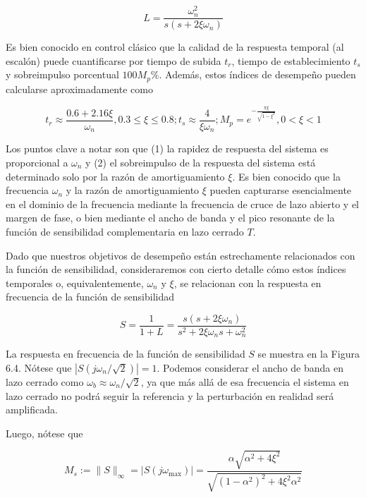 $$
L=\frac{\omega_{n}^{2}}{s\left(s+2 \xi \omega_{n}\right)}
$$

Es bien conocido en control clásico que la calidad de la respuesta temporal (al escalón) puede cuantificarse por tiempo de subida $t_{r}$, tiempo de establecimiento $t_{s}$ y sobreimpulso porcentual $100 M_{p} \%$. Además, estos índices de desempeño pueden calcularse aproximadamente como

$$
t_{r} \approx \frac{0.6+2.16 \xi}{\omega_{n}}, 0.3 \leq \xi \leq 0.8 ; t_{s} \approx \frac{4}{\xi \omega_{n}} ; M_{p}=e^{-\frac{\pi \xi}{\sqrt{1-\xi^{2}}}}, 0<\xi<1
$$

Los puntos clave a notar son que (1) la rapidez de respuesta del sistema es proporcional a $\omega_{n}$ y (2) el sobreimpulso de la respuesta del sistema está determinado solo por la razón de amortiguamiento $\xi$. Es bien conocido que la frecuencia $\omega_{n}$ y la razón de amortiguamiento $\xi$ pueden capturarse esencialmente en el dominio de la frecuencia mediante la frecuencia de cruce de lazo abierto y el margen de fase, o bien mediante el ancho de banda y el pico resonante de la función de sensibilidad complementaria en lazo cerrado $T$.

Dado que nuestros objetivos de desempeño están estrechamente relacionados con la función de sensibilidad, consideraremos con cierto detalle cómo estos índices temporales o, equivalentemente, $\omega_{n}$ y $\xi$, se relacionan con la respuesta en frecuencia de la función de sensibilidad

$$
S=\frac{1}{1+L}=\frac{s\left(s+2 \xi \omega_{n}\right)}{s^{2}+2 \xi \omega_{n} s+\omega_{n}^{2}}
$$


La respuesta en frecuencia de la función de sensibilidad $S$ se muestra en la Figura 6.4. Nótese que $\left|S\left(j \omega_{n} / \sqrt{2}\right)\right|=1$. Podemos considerar el ancho de banda en lazo cerrado como $\omega_{b} \approx \omega_{n} / \sqrt{2}$, ya que más allá de esa frecuencia el sistema en lazo cerrado no podrá seguir la referencia y la perturbación en realidad será amplificada.

Luego, nótese que

$$
M_{s}:=\|S\|_{\infty}=\left|S\left(j \omega_{\max }\right)\right|=\frac{\alpha \sqrt{\alpha^{2}+4 \xi^{2}}}{\sqrt{\left(1-\alpha^{2}\right)^{2}+4 \xi^{2} \alpha^{2}}}
$$

